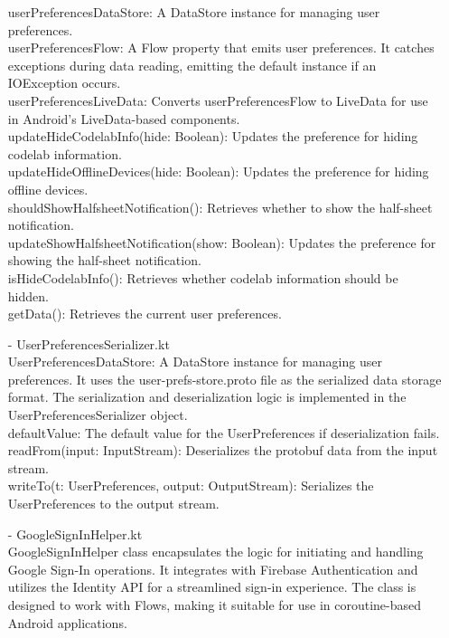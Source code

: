 \begin{enumerate}
                              userPreferencesDataStore: A DataStore instance for managing user preferences.\\

                              userPreferencesFlow: A Flow property that emits user preferences. It catches exceptions during data reading, emitting the default instance if an IOException occurs.\\
                              userPreferencesLiveData: Converts userPreferencesFlow to LiveData for use in Android's LiveData-based components.\\

                              updateHideCodelabInfo(hide: Boolean): Updates the preference for hiding codelab information.\\
                              updateHideOfflineDevices(hide: Boolean): Updates the preference for hiding offline devices.\\
                              shouldShowHalfsheetNotification(): Retrieves whether to show the half-sheet notification.\\
                              updateShowHalfsheetNotification(show: Boolean): Updates the preference for showing the half-sheet notification.\\
                              isHideCodelabInfo(): Retrieves whether codelab information should be hidden.\\
                              getData(): Retrieves the current user preferences.\\
                        \item[-] UserPreferencesSerializer.kt\\
                              UserPreferencesDataStore: A DataStore instance for managing user preferences.
                              It uses the user-prefs-store.proto file as the serialized data storage format.
                              The serialization and deserialization logic is implemented in the UserPreferencesSerializer object.\\
                              defaultValue: The default value for the UserPreferences if deserialization fails.\\
                              readFrom(input: InputStream): Deserializes the protobuf data from the input stream.\\
                              writeTo(t: UserPreferences, output: OutputStream): Serializes the UserPreferences to the output stream.\\
                        \item[-] GoogleSignInHelper.kt\\
                              GoogleSignInHelper class encapsulates the logic for initiating and handling Google Sign-In operations. It integrates with Firebase Authentication and utilizes the Identity API for a streamlined sign-in experience. The class is designed to work with Flows, making it suitable for use in coroutine-based Android applications.\\

                    \end{enumerate}